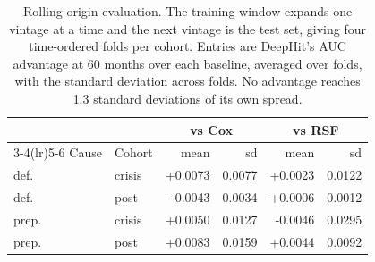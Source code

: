 \begin{table}[t]
\caption{Rolling-origin evaluation. The training window expands one vintage at a time and the next vintage is the test set, giving four time-ordered folds per cohort. Entries are DeepHit's AUC advantage at 60 months over each baseline, averaged over folds, with the standard deviation across folds. No advantage reaches 1.3 standard deviations of its own spread.}
\label{tab:rolling}
\centering\footnotesize
\setlength{\tabcolsep}{4pt}
\begin{tabular}{@{}llrrrr@{}}
\toprule
& & \multicolumn{2}{c}{vs Cox} & \multicolumn{2}{c}{vs RSF} \\
\cmidrule(lr){3-4}\cmidrule(lr){5-6}
Cause & Cohort & mean & sd & mean & sd \\
\midrule
def. & crisis & +0.0073 & 0.0077 & +0.0023 & 0.0122 \\
def. & post & -0.0043 & 0.0034 & +0.0006 & 0.0012 \\
prep. & crisis & +0.0050 & 0.0127 & -0.0046 & 0.0295 \\
prep. & post & +0.0083 & 0.0159 & +0.0044 & 0.0092 \\
\bottomrule
\end{tabular}
\end{table}
